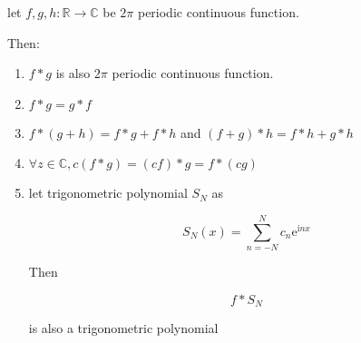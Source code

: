 \begin{thm}
    let $f,g, h: \mathbb{R} \to \mathbb{C}$ be $2\pi$ periodic continuous function. 
    
    Then:

    \begin{enumerate}
        \item $f \ast g$ is also $2\pi$ periodic continuous function.

        \item $f \ast g = g \ast f$

        \item $f \ast (g + h) = f \ast g + f \ast h$ and $(f+g) \ast h = f \ast h + g \ast h$

        \item $\forall z \in \mathbb{C}, c (f\ast g) = (cf) \ast g = f \ast (cg)$

        \item let trigonometric polynomial $S_N$ as

        \[
            S_N(x) = \sum_{n=-N}^{N} c_n\mathrm{e}^{\mathrm{i}nx}
        \]

        Then

        \[
            f \ast S_N
        \]

        is also a trigonometric polynomial

    \end{enumerate}
\end{thm}

